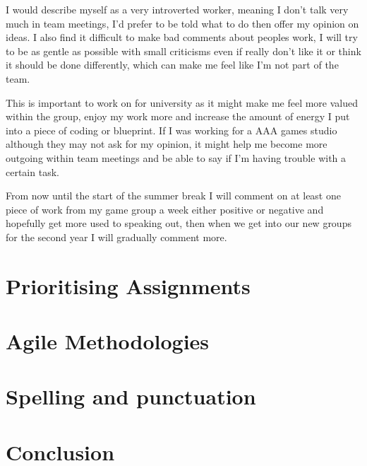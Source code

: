 \documentclass{scrartcl}
\begin{document}
I would describe myself as a very introverted worker, meaning I don't talk very much in team meetings, I'd prefer to be told what to do then offer my opinion on ideas. I also find it difficult to make bad comments about peoples work, I will try to be as gentle as possible with small criticisms even if really don't like it or think it should be done differently, which can make me feel like I'm not part of the team. 

This is important to work on for university as it might make me feel more valued within the group, enjoy my work more and increase the amount of energy I put into a piece of coding or blueprint. If I was working for a AAA games studio although they may not ask for my opinion, it might help me become more outgoing within team meetings and be able to say if I'm having trouble with a certain task.

From now until the start of the summer break I will comment on at least one piece of work from my game group a week either positive or negative and hopefully get more used to speaking out, then when we get into our new groups for the second year I will gradually comment more.

\section*{Prioritising Assignments}



\section*{Agile Methodologies}



\section*{Spelling and punctuation}



\section*{Conclusion}
\end{document}
